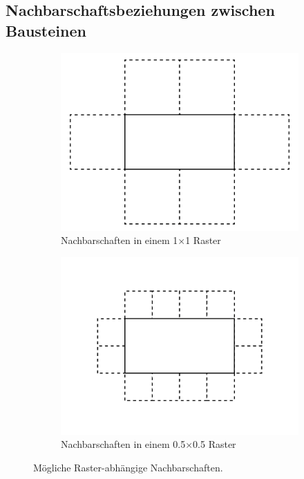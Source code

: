 \subsection{Nachbarschaftsbeziehungen zwischen Bausteinen}
\begin{figure}[h!bt]
  \begin{subfigure}[b]{0.5\columnwidth}
    \includegraphics[width=\columnwidth]{fig/raster_neighbors1.png}
    \caption{Nachbarschaften in einem 1$\times$1 Raster}\label{fig:real:raster_neigbors1}
  \end{subfigure}
  \hfill
  \begin{subfigure}[b]{0.5\columnwidth}
    \includegraphics[width=\columnwidth]{fig/raster_neighbors2.png}
    \caption{Nachbarschaften in einem 0.5$\times$0.5 Raster}\label{fig:real:raster_neigbors2}
  \end{subfigure}
  \caption{Mögliche Raster-abhängige Nachbarschaften.}\label{fig:real:raster_neigbors}
\end{figure}

